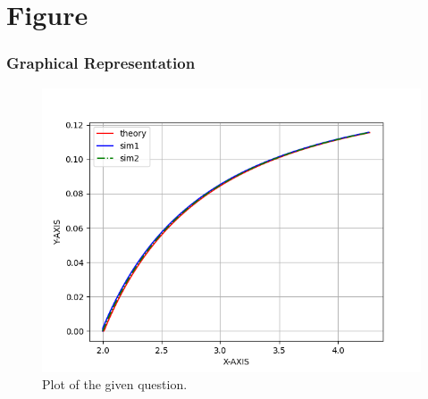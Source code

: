 \documentclass{beamer}
\begin{document}
\section{Figure}
\begin{frame}
\frametitle{Graphical Representation}
\begin{figure}[h]
    \centering
    \includegraphics[width=\columnwidth]{fig.png}
    \caption{Plot of the given question.}
\end{figure}
\end{frame}
\end{document}
